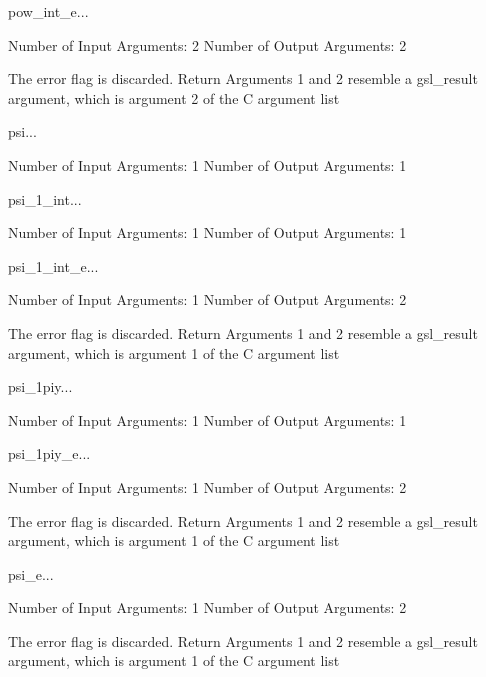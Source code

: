 \begin{funcdesc}{pow_int_e}{...}

    Number of Input  Arguments:  2
    Number of Output Arguments:  2

The error flag is discarded.
Return Arguments 1 and 2 resemble a gsl_result argument,
	which is  argument 2 of the C argument list

\end{funcdesc}

\begin{funcdesc}{psi}{...}

    Number of Input  Arguments:  1
    Number of Output Arguments:  1
\end{funcdesc}

\begin{funcdesc}{psi_1_int}{...}

    Number of Input  Arguments:  1
    Number of Output Arguments:  1
\end{funcdesc}

\begin{funcdesc}{psi_1_int_e}{...}

    Number of Input  Arguments:  1
    Number of Output Arguments:  2

The error flag is discarded.
Return Arguments 1 and 2 resemble a gsl_result argument,
	which is  argument 1 of the C argument list

\end{funcdesc}

\begin{funcdesc}{psi_1piy}{...}

    Number of Input  Arguments:  1
    Number of Output Arguments:  1
\end{funcdesc}

\begin{funcdesc}{psi_1piy_e}{...}

    Number of Input  Arguments:  1
    Number of Output Arguments:  2

The error flag is discarded.
Return Arguments 1 and 2 resemble a gsl_result argument,
	which is  argument 1 of the C argument list

\end{funcdesc}

\begin{funcdesc}{psi_e}{...}

    Number of Input  Arguments:  1
    Number of Output Arguments:  2

The error flag is discarded.
Return Arguments 1 and 2 resemble a gsl_result argument,
	which is  argument 1 of the C argument list

\end{funcdesc}

